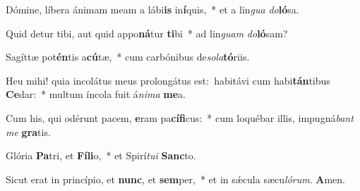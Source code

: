 \vs Dómine, líbera ánimam meam a lábi\textbf{is} in\textbf{í}quis,~* et a lin\textit{gua} \textit{do}\textbf{ló}sa.

\vs Quid detur tibi, aut quid appo\textbf{ná}tur \textbf{ti}bi~* ad lin\textit{guam} \textit{do}\textbf{ló}sam?

\vs Sagíttæ pot\textbf{én}tis a\textbf{cú}tæ,~* cum carbónibus de\textit{so}\textit{la}\textbf{tó}riis.

\vs Heu mihi! quia incolátus meus prolongátus est:~\reddagger habitávi cum habi\-\textbf{tán}\-ti\-bus \textbf{Ce}dar:~* multum íncola fuit á\textit{ni}\textit{ma} \textbf{me}a.

\vs Cum his, qui odérunt pacem, \textbf{e}ram pa\textbf{cí}\textbf{fi}cus:~* cum loquébar illis, impugná\textit{bant} \textit{me} \textbf{gra}tis.

\vs Glória \textbf{Pa}tri, et \textbf{Fí}\textbf{li}o,~* et Spirí\textit{tu}\textit{i} \textbf{Sanc}to.

\vs Sicut erat in princípio, et \textbf{nunc}, et \textbf{sem}per,~* et in sǽcula sæcu\textit{ló}\textit{rum}. \textbf{A}men.

